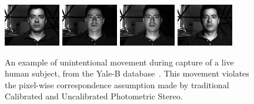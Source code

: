 \begin{figure}
    \hspace*{\fill}
    \includegraphics[width=0.22\textwidth]{collection_ps/images/yaleb/yaleB06_P00A+000E+20} \hfill
    \includegraphics[width=0.22\textwidth]{collection_ps/images/yaleb/yaleB06_P00A+000E-20} \hfill
    \includegraphics[width=0.22\textwidth]{collection_ps/images/yaleb/yaleB06_P00A+005E-10} \hfill
    \includegraphics[width=0.22\textwidth]{collection_ps/images/yaleb/yaleB06_P00A-020E+10}
    \hspace*{\fill}
    \caption{An example of unintentional movement during capture of a live
             human subject, from the Yale-B database~\cite{georghiades2001fromfew}.
             This movement violates the pixel-wise correspondence assumption
             made by traditional Calibrated and Uncalibrated Photometric
             Stereo.}
\label{fig:imag_coll_yaleb_movement_example}
\end{figure}


